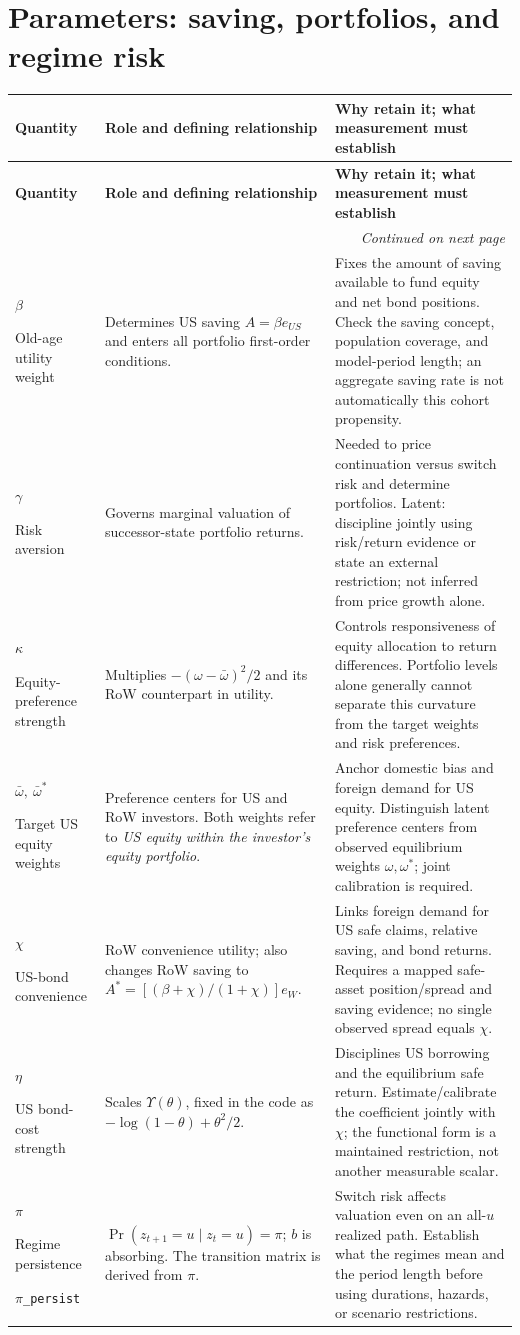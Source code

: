 \documentclass[10pt,a4paper,landscape]{article}
\makeatletter
\newcommand{\code}[1]{{\footnotesize\texttt{#1}}}
\newenvironment{coretable}{%
\begin{longtable}{@{}P{\dimexpr .19\textwidth-3.8pt\relax}P{\dimexpr .35\textwidth-7pt\relax}P{\dimexpr .46\textwidth-9.2pt\relax}@{}}
\toprule
\rowcolor{tablehead}\textbf{Quantity} & \textbf{Role and defining relationship} & \textbf{Why retain it; what measurement must establish}\\
\midrule
\endfirsthead
\toprule
\rowcolor{tablehead}\textbf{Quantity} & \textbf{Role and defining relationship} & \textbf{Why retain it; what measurement must establish}\\
\midrule
\endhead
\midrule\multicolumn{3}{r}{\footnotesize\itshape Continued on next page}\\
\endfoot
\bottomrule
\endlastfoot
}{\end{longtable}}
\makeatother
\begin{document}
\section{Parameters: saving, portfolios, and regime risk}
\begin{coretable}
$\beta$\par Old-age utility weight & Determines US saving $A=\beta e_{US}$ and enters all portfolio first-order conditions. & Fixes the amount of saving available to fund equity and net bond positions. Check the saving concept, population coverage, and model-period length; an aggregate saving rate is not automatically this cohort propensity.\\[4pt]
$\gamma$\par Risk aversion & Governs marginal valuation of successor-state portfolio returns. & Needed to price continuation versus switch risk and determine portfolios. Latent: discipline jointly using risk/return evidence or state an external restriction; not inferred from price growth alone.\\[4pt]
$\kappa$\par Equity-preference strength & Multiplies $-(\omega-\bar\omega)^2/2$ and its RoW counterpart in utility. & Controls responsiveness of equity allocation to return differences. Portfolio levels alone generally cannot separate this curvature from the target weights and risk preferences.\\[4pt]
$\bar\omega,\ \bar\omega^*$\par Target US equity weights & Preference centers for US and RoW investors. Both weights refer to \emph{US equity within the investor's equity portfolio}. & Anchor domestic bias and foreign demand for US equity. Distinguish latent preference centers from observed equilibrium weights $\omega,\omega^*$; joint calibration is required.\\[4pt]
$\chi$\par US-bond convenience & RoW convenience utility; also changes RoW saving to $A^*=[(\beta+\chi)/(1+\chi)]e_W$. & Links foreign demand for US safe claims, relative saving, and bond returns. Requires a mapped safe-asset position/spread and saving evidence; no single observed spread equals $\chi$.\\[4pt]
$\eta$\par US bond-cost strength & Scales $\Upsilon(\theta)$, fixed in the code as $-\log(1-\theta)+\theta^2/2$. & Disciplines US borrowing and the equilibrium safe return. Estimate/calibrate the coefficient jointly with $\chi$; the functional form is a maintained restriction, not another measurable scalar.\\[4pt]
$\pi$\par Regime persistence\par$\pi$\code{\_persist} & $\Pr(z_{t+1}=u\mid z_t=u)=\pi$; $b$ is absorbing. The transition matrix is derived from $\pi$. & Switch risk affects valuation even on an all-$u$ realized path. Establish what the regimes mean and the period length before using durations, hazards, or scenario restrictions.\\[4pt]
\end{coretable}
\end{document}
